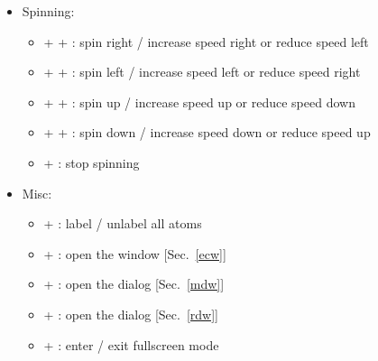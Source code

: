 {\begin{itemize}
\begin{itemize}
\begin{itemize}
\item[] \Shift + \UArrow : zoom out
\item[] \Shift + \DArrow : zoom in 
\end{itemize}
\item Spinning: 
\begin{itemize}
\item[] \Ctrl + \Shift + \RArrow : spin right / increase speed right or reduce speed left
\item[] \Ctrl + \Shift + \RArrow : spin left / increase speed left or reduce speed right
\item[] \Ctrl + \Shift + \UArrow : spin up / increase speed up or reduce speed down
\item[] \Ctrl + \Shift + \DArrow : spin down / increase speed down or reduce speed up
\item[] \Ctrl +  : stop spinning 
\end{itemize}
\item Misc:
\begin{itemize}
\item[] \Ctrl +  : label / unlabel all atoms 
\item[] \Ctrl +  : open the  window [Sec.~\ref{ecw}]
\item[] \Ctrl +  : open the  dialog [Sec.~\ref{mdw}]
\item[] \Ctrl +  : open the  dialog [Sec.~\ref{rdw}]
\item[] \Ctrl +  : enter / exit fullscreen mode 
\end{itemize}
\end{itemize}
\end{itemize}}

